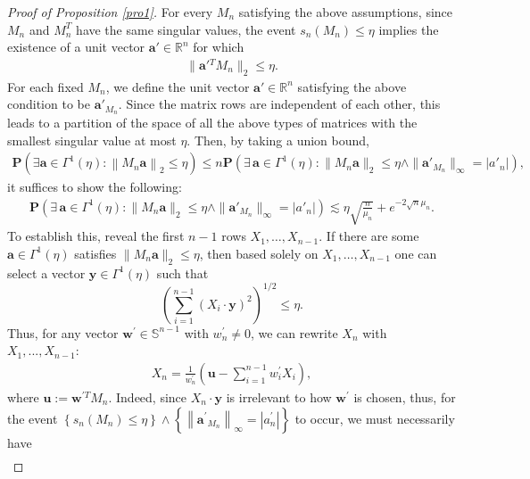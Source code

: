 \documentclass[10pt,a4paper]{amsart}
\begin{document}
\begin{proof}[Proof of Proposition \ref{pro1}]
For every $M_n$ satisfying the above assumptions, since $M_n$ and $M_n^T$ have the same singular values, the event $s_n(M_n)\leq\eta$ implies the existence of a unit vector $\boldsymbol a'\in\mathbb R^n$ for which
\begin{align*}
\|\boldsymbol a'{}^T M_n\|_2 \leq\eta.
\end{align*}
For each fixed $M_n$, we define the unit vector $\boldsymbol a'\in\mathbb R^n$ satisfying the above condition to be $\boldsymbol a'_{M_n}$. Since the matrix rows are independent of each other, this leads to a partition of the space of all the above types of matrices with the smallest singular value at most $\eta$. Then, by taking a union bound, 
\begin{align*}
\textbf{P}\left(\exists \boldsymbol{a} \in \Gamma^1(\eta):\left\|M_n \boldsymbol{a}\right\|_2 \leq \eta\right)\leq n \textbf{P}\left(\exists\,\boldsymbol a\in\Gamma^1(\eta):
\|M_n\boldsymbol a\|_2\le\eta \wedge
\|\boldsymbol a'_{M_n}\|_\infty=|a'_n|\right),
\end{align*}
it suffices to show the following:
\begin{align}\label{pro30}
\textbf{P}\left(\exists\,\boldsymbol a\in\Gamma^1(\eta):
\|M_n\boldsymbol a\|_2\le\eta \wedge
\|\boldsymbol a'_{M_n}\|_\infty=|a'_n|\right)
\lesssim\eta\sqrt {\frac{n}{\mu_{n}}} +e^{-2\sqrt n\mu_{n}}.
\end{align}
To establish this, reveal the first \(n-1\) rows \(X_1,\dots,X_{n-1}\).  If there are some $\boldsymbol a\in\Gamma^1(\eta)$ satisfies $\|M_n\boldsymbol a\|_2\le\eta$, then based solely on \(X_1,\dots,X_{n-1}\) one can select a vector \(\boldsymbol y\in\Gamma^1(\eta)\) such that
\[
\left(\sum_{i=1}^{n-1}(X_i\cdot\boldsymbol y)^2\right)^{1/2}
\le\eta.
\]
Thus, for any vector $\boldsymbol{w}^{\prime} \in \mathbb{S}^{n-1}$ with $w_n^{\prime} \neq 0$, we can rewrite $X_n$ with $X_1,...,X_{n-1}$:
\begin{align*}
X_n=\frac{1}{w_n^{\prime}}\left(\boldsymbol{u}-\sum_{i=1}^{n-1} w_i^{\prime} X_i\right),
\end{align*}
where $\boldsymbol{u}:=\boldsymbol{w}^{\prime T} M_n$. Indeed, since $X_n \cdot \boldsymbol{y}$ is irrelevant to how $\boldsymbol{w}^{\prime}$ is chosen,
thus, for the event $\left\{s_n\left(M_n\right) \leq \eta\right\} \wedge\left\{\left\|\boldsymbol{a}^{\prime}{ }_{M_n}\right\|_{\infty}=\left|a_n^{\prime}\right|\right\}$ to occur, we must necessarily have
\begin{align}\label{pro31}

\end{align}
\end{proof}
\end{document}
